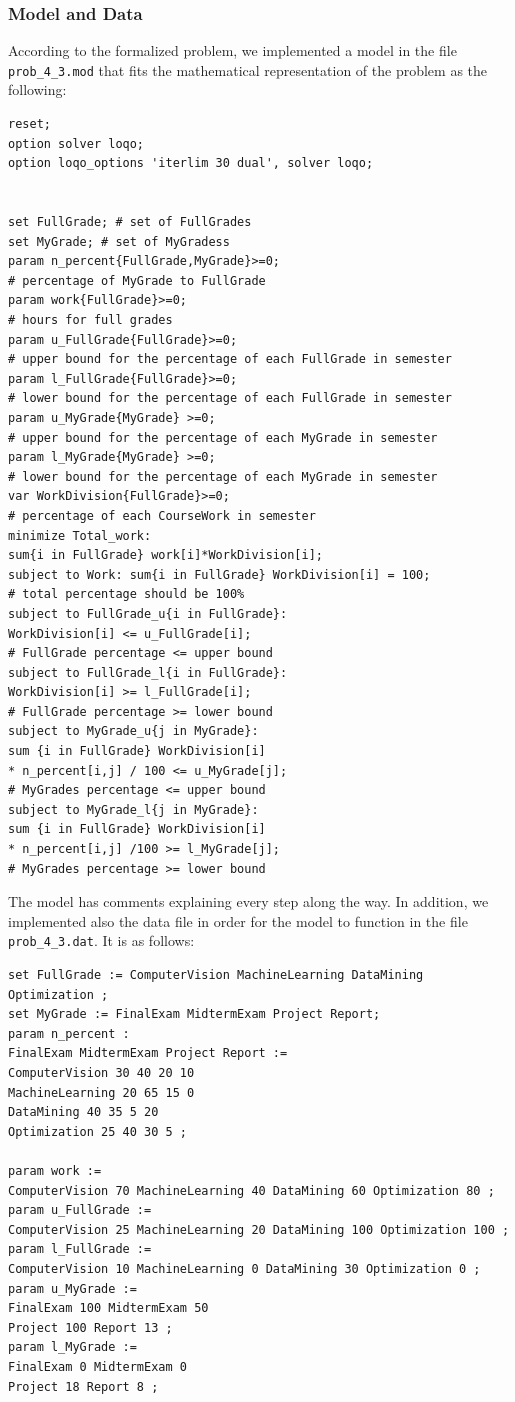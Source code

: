 \subsubsection{Model and Data}
According to the formalized problem, we implemented a model in the file \texttt{prob\_4\_3.mod} that fits the mathematical representation of the problem as the following:

\begin{verbatim}
reset;
option solver loqo;
option loqo_options 'iterlim 30 dual', solver loqo;


set FullGrade; # set of FullGrades
set MyGrade; # set of MyGradess
param n_percent{FullGrade,MyGrade}>=0;
# percentage of MyGrade to FullGrade
param work{FullGrade}>=0;
# hours for full grades
param u_FullGrade{FullGrade}>=0;
# upper bound for the percentage of each FullGrade in semester
param l_FullGrade{FullGrade}>=0;
# lower bound for the percentage of each FullGrade in semester
param u_MyGrade{MyGrade} >=0;
# upper bound for the percentage of each MyGrade in semester
param l_MyGrade{MyGrade} >=0;
# lower bound for the percentage of each MyGrade in semester
var WorkDivision{FullGrade}>=0;
# percentage of each CourseWork in semester
minimize Total_work:
sum{i in FullGrade} work[i]*WorkDivision[i];
subject to Work: sum{i in FullGrade} WorkDivision[i] = 100;
# total percentage should be 100%
subject to FullGrade_u{i in FullGrade}: 
WorkDivision[i] <= u_FullGrade[i];
# FullGrade percentage <= upper bound
subject to FullGrade_l{i in FullGrade}: 
WorkDivision[i] >= l_FullGrade[i];
# FullGrade percentage >= lower bound
subject to MyGrade_u{j in MyGrade}: 
sum {i in FullGrade} WorkDivision[i] 
* n_percent[i,j] / 100 <= u_MyGrade[j];
# MyGrades percentage <= upper bound
subject to MyGrade_l{j in MyGrade}: 
sum {i in FullGrade} WorkDivision[i] 
* n_percent[i,j] /100 >= l_MyGrade[j];
# MyGrades percentage >= lower bound
\end{verbatim}
The model has comments explaining every step along the way. In addition, we implemented also the data file in order for the model to function in the file \texttt{prob\_4\_3.dat}. It is as follows:
\begin{verbatim}
set FullGrade := ComputerVision MachineLearning DataMining Optimization ;
set MyGrade := FinalExam MidtermExam Project Report;
param n_percent :
FinalExam MidtermExam Project Report :=
ComputerVision 30 40 20 10
MachineLearning 20 65 15 0
DataMining 40 35 5 20
Optimization 25 40 30 5 ;

param work :=
ComputerVision 70 MachineLearning 40 DataMining 60 Optimization 80 ;
param u_FullGrade :=
ComputerVision 25 MachineLearning 20 DataMining 100 Optimization 100 ;
param l_FullGrade :=
ComputerVision 10 MachineLearning 0 DataMining 30 Optimization 0 ;
param u_MyGrade :=
FinalExam 100 MidtermExam 50
Project 100 Report 13 ;
param l_MyGrade :=
FinalExam 0 MidtermExam 0
Project 18 Report 8 ;
\end{verbatim}
